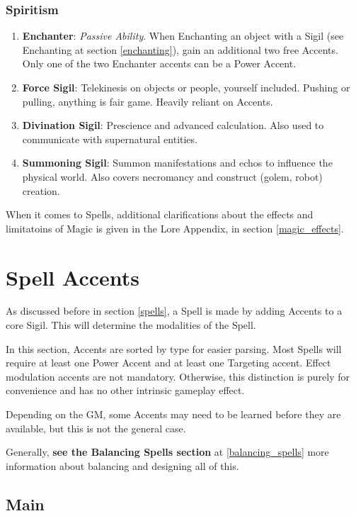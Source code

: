 \subsubsection{Spiritism}
\begin{enumerate}
    \item \textbf{Enchanter}: \textit{Passive Ability}. When Enchanting an object with a Sigil (see Enchanting at section \ref{enchanting}), gain an additional two free Accents. Only one of the two Enchanter accents can be a Power Accent.
    \item \textbf{Force Sigil}: Telekinesis on objects or people, yourself included. Pushing or pulling, anything is fair game. Heavily reliant on Accents.
    \item \textbf{Divination Sigil}: Prescience and advanced calculation. Also used to communicate with supernatural entities.
    \item \textbf{Summoning Sigil}: Summon manifestations and echos to influence the physical world. Also covers necromancy and construct (golem, robot) creation.
\end{enumerate}

When it comes to Spells, additional clarifications about the effects and limitatoins of Magic is given in the Lore Appendix, in section \ref{magic_effects}.


\section{Spell Accents}
\label{spell_accents}

As discussed before in section \ref{spells}, a Spell is made by adding Accents to a core Sigil. This will determine the modalities of the Spell. 

In this section, Accents are sorted by type for easier parsing. Most Spells will require at least one Power Accent and at least one Targeting accent. Effect modulation accents are not mandatory.
Otherwise, this distinction is purely for convenience and has no other intrinsic gameplay effect.

Depending on the GM, some Accents may need to be learned before they are available, but this is not the general case.

Generally, \textbf{see the Balancing Spells section} at \ref{balancing_spells} more information about balancing and designing all of this.

\subsection{Main}

